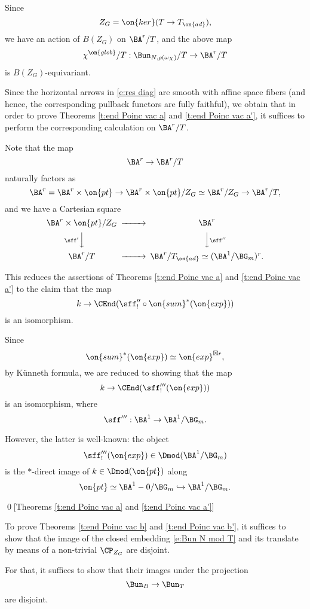 \documentclass[9pt]{amsart}
\theoremstyle{remark}
\theoremstyle{definition}
\theoremstyle{remark}
\numberwithin{equation}{section}
\begin{document}
\sssec{}

Since 
$$Z_G=\on{ker}(T\to T_{\on{ad}}),$$
we have an action of $B(Z_G)$ on $\BA^r/T$, and the 
above map 
$$\chi^{\on{glob}}/T:\Bun_{N,\rho(\omega_X)}/T\to \BA^r/T$$
is $B(Z_G)$-equivariant.

\medskip

Since the horizontal arrows in \eqref{e:res diag} are smooth with affine space fibers
(and hence, the corresponding pullback functors are fully faithful), we obtain that 
in order to prove Theorems \ref{t:end Poinc vac a} and \ref{t:end Poinc vac a'},
it suffices to perform the corresponding calculation on $\BA^r/T$.

\sssec{}

Note that the map
$$\BA^r\to \BA^r/T$$
naturally factors as
$$\BA^r=\BA^r \times \on{pt} \to \BA^r\times \on{pt}/Z_G\simeq \BA^r/Z_G \to \BA^r/T,$$
and we have a Cartesian square
$$
\CD
\BA^r\times \on{pt}/Z_G @>>> \BA^r  \\
@V{\sff'}VV @VV{\sff''}V \\
\BA^r/T @>>> \BA^r/T_{\on{ad}}\simeq (\BA^1/\BG_m)^r.
\endCD
$$

This reduces the assertions of Theorems \ref{t:end Poinc vac a} and \ref{t:end Poinc vac a'} to the claim that the map
$$k\to \CEnd(\sff''_!\circ \on{sum}^*(\on{exp}))$$
is an isomorphism.

\sssec{}

Since 
$$\on{sum}^*(\on{exp}) \simeq \on{exp}^{\boxtimes r},$$
by K\"unneth formula, we are reduced to showing that the map
$$k\to \CEnd(\sff'''_!(\on{exp}))$$
is an isomorphism, where
$$\sff''':\BA^1\to \BA^1/\BG_m.$$

However, the latter is well-known: the object 
$$\sff'''_!(\on{exp})\in \Dmod(\BA^1/\BG_m)$$
is the $*$-direct image of $k\in \Dmod(\on{pt})$ along
$$\on{pt}\simeq \BA^1-0/\BG_m\hookrightarrow \BA^1/\BG_m.$$

\qed[Theorems \ref{t:end Poinc vac a} and \ref{t:end Poinc vac a'}]

 \label{ss:proof of end Poinc transl}

\sssec{}

To prove Theorems \ref{t:end Poinc vac b} and \ref{t:end Poinc vac b'}, it suffices to show that the image of the
closed embedding \eqref{e:Bun N mod T} and its translate by means of a non-trivial $\CP_{Z_G}$ are disjoint.

\medskip

For that, it suffices to show that their images under the projection
$$\Bun_B\to \Bun_T$$
are disjoint. 
\end{document}
